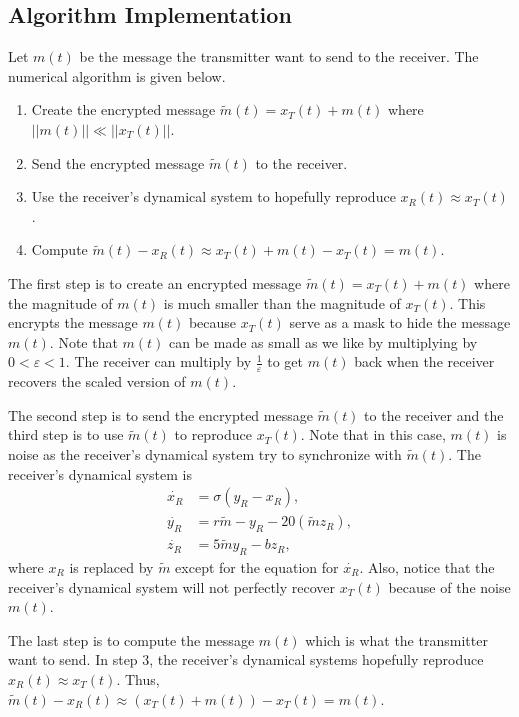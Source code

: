 \documentclass[12pt]{article}
\begin{document}
    \subsection{Algorithm Implementation}
    Let $m(t)$ be the message the transmitter want to send to the receiver. The numerical algorithm is given below. 
    \begin{enumerate}
      \item Create the encrypted message $\widetilde{m}(t) = x_T (t) + m(t)$ where $||m(t)|| \ll ||x_T(t)||$. 
        \item Send the encrypted message $\widetilde{m}(t)$ to the receiver. 
        \item Use the receiver's dynamical system to hopefully reproduce $x_R(t) \approx x_T(t)$. 
        \item Compute $\widetilde{m}(t) - x_R(t) \approx x_T (t) + m(t) - x_T(t) = m(t)$. 
    \end{enumerate}
    The first step is to create an encrypted message $\widetilde{m}(t) = x_T (t) + m(t)$ where the magnitude of $m(t)$ is much smaller than the magnitude of $x_T(t)$. This encrypts the message $m(t)$ because $x_T(t)$ serve as a mask to hide the message $m(t)$. Note that $m(t)$ can be made as small as we like by multiplying by $0 < \varepsilon < 1$. The receiver can multiply by $\frac{1}{\varepsilon}$ to get $m(t)$ back when the receiver recovers the scaled version of $m(t)$.  

    The second step is to send the encrypted message $\widetilde{m}(t)$ to the receiver and the third step is to use $\widetilde{m}(t)$ to reproduce $x_T(t)$. Note that in this case, $m(t)$ is noise as the receiver's dynamical system try to synchronize with $\widetilde{m}(t)$. The receiver's dynamical system is 
    \begin{equation*} 
      \begin{aligned}
        \dot{x_R} &= \sigma (y_R-x_R), \\
        \dot{y_R} &= r  \widetilde{m} - y_R - 20 (\widetilde{m}   z_R),\\
        \dot{z_R} &= 5 \widetilde{m} y_R - b  z_R,
      \end{aligned}
    \end{equation*}
    where $x_R$ is replaced by $\widetilde{m}$ except for the equation for $\dot{x_R}$. Also, notice that the receiver's dynamical system will not perfectly recover $x_T(t)$ because of the noise $m(t)$. 

    The last step is to compute the message $m(t)$ which is what the transmitter want to send. In step $3$, the receiver's dynamical systems hopefully reproduce $x_R(t) \approx x_T(t)$. Thus, $\widetilde{m}(t) - x_R(t) \approx (x_T(t) + m(t)) - x_T(t) = m(t)$. 
\end{document}
